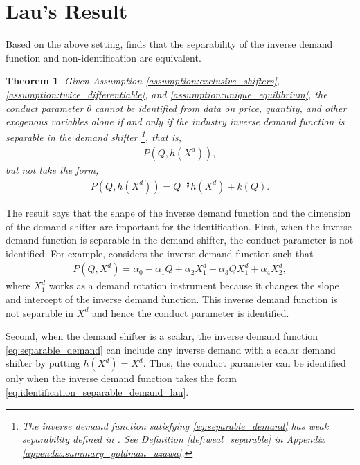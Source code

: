 \documentclass[11pt, a4paper]{article}
\newtheorem{theorem}{Theorem}
\theoremstyle{remark}
\begin{document}
\section{Lau's Result}\label{sec:lau_result}
Based on the above setting, \citet{lau1982identifying} finds that the separability of the inverse demand function and non-identification are equivalent.
\begin{theorem}\label{theorem_lau}
    Given Assumption \ref{assumption:exclusive_shifters}, \ref{assumption:twice_differentiable}, and \ref{assumption:unique_equilibrium},
    the conduct parameter $\theta$ cannot be identified from data on price, quantity, and other exogenous variables alone if and only if the industry inverse demand function is separable in the demand shifter \footnote{The inverse demand function satisfying \eqref{eq:separable_demand} has weak separability defined in \citet{goldmanNote1964}. See Definition \ref{def:weal_separable} in Appendix \ref{appendix:summary_goldman_uzawa}.}, that is,
    \begin{align}
        P(Q, h(X^{d})), \label{eq:separable_demand}
    \end{align}
    but not take the form, 
    \begin{align}
        P(Q, h(X^{d})) = Q^{-\frac{1}{\theta}}h(X^{d}) + k(Q). \label{eq:identification_separable_demand_lau}
    \end{align}
\end{theorem}
The result says that the shape of the inverse demand function and the dimension of the demand shifter are important for the identification.
First, when the inverse demand function is separable in the demand shifter, the conduct parameter is not identified.
For example, \citet{bresnahan1982oligopoly} considers the inverse demand function such that 
\begin{align}
    P(Q, X^{d}) = \alpha_0 - \alpha_1Q + \alpha_2X^{d}_1 + \alpha_3QX^{d}_1 + \alpha_4X^{d}_2, \label{eq:demand_bresnahan}
\end{align}
where $X^{d}_1$ works as a demand rotation instrument because it changes the slope and intercept of the inverse demand function.
This inverse demand function is not separable in $X^{d}$ and hence the conduct parameter is identified.

Second, when the demand shifter is a scalar, the inverse demand function \eqref{eq:separable_demand} can include any inverse demand with a scalar demand shifter by putting $h(X^{d})= X^{d}$.
Thus, the conduct parameter can be identified only when the inverse demand function takes the form \eqref{eq:identification_separable_demand_lau}.
\end{document}
